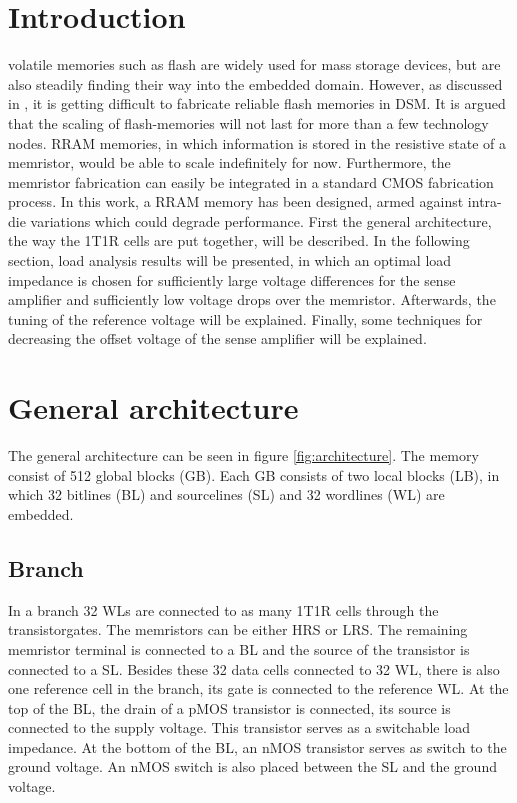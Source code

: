 \documentclass[journal]{IEEEtran}
\begin{document}
\section{Introduction}
% 
% 
% 
% 
 volatile memories such as flash are widely used for mass storage devices, but are also steadily finding their way into the embedded domain. However, as discussed in \cite{Pra10}, it is getting difficult to fabricate reliable flash memories in DSM. It is argued that the scaling of flash-memories will not last for more than a few technology nodes. RRAM memories, in which information is stored in the resistive state of a memristor, would be able to scale indefinitely for now. Furthermore, the memristor fabrication can easily be integrated in a standard CMOS fabrication process. In this work, a RRAM memory has been designed, armed against intra-die variations which could degrade performance. 
First the general architecture, the way the 1T1R cells are put together, will be described. In the following section, load analysis results will be presented, in which an optimal load impedance is chosen for sufficiently large voltage differences for the sense amplifier and sufficiently low voltage drops over the memristor. Afterwards, the tuning of the reference voltage will be explained. Finally, some techniques for decreasing the offset voltage of the sense amplifier will be explained.


\section{General architecture}
The general architecture can be seen in figure \ref{fig:architecture}. The memory consist of 512 global blocks (GB). Each GB consists of two local blocks (LB), in which 32 bitlines (BL) and sourcelines (SL) and 32 wordlines (WL) are embedded.

\subsection{Branch}
In a branch 32 WLs are connected to as many 1T1R cells through the transistorgates. The memristors can be either HRS or LRS. The remaining memristor terminal is connected to a BL and the source of the transistor is connected to a SL. Besides these 32 data cells connected to 32 WL, there is also one reference cell in the branch, its gate is connected to the reference WL. At the top of the BL, the drain of a pMOS transistor is connected, its source is connected to the supply voltage. This transistor serves as a switchable load impedance. At the bottom of the BL, an nMOS transistor serves as switch to the ground voltage. An nMOS switch is also placed between the SL and the ground voltage. 
\end{document}
